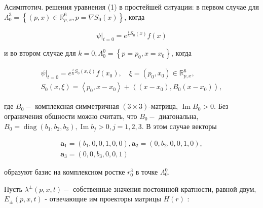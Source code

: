 \documentclass[10pt]{article}
\begin{document}
Асимптотич. решения уравнения (1) в простейшей ситуации: в первом случае для $\Lambda_{0}^{3}=\left\{(p, x) \in \mathbb{R}_{p, x}^{6}, p=\nabla S_{0}(x)\right\}$, когда



\[

\left.\psi\right|_{t=0}=e^{\frac{i}{\hbar} S_{0}(x)} f(x)

\]



и во втором случае для $k=0, \Lambda_{0}^{0}=\left\{p=p_{0}, x=x_{0}\right\}$, когда



\[

\begin{gathered}

\left.\psi\right|_{t=0}=e^{\frac{i}{\hbar} S_{0}(x, \xi)} f\left(x_{0}\right), \quad \xi=\left(p_{0}, x_{0}\right) \in \mathbb{R}_{p, x}^{6}, \\

S_{0}(x, \xi)=\left\langle p_{0}, x-x_{0}\right\rangle+\left\langle\left(x-x_{0}\right), B_{0}\left(x-x_{0}\right)\right\rangle,

\end{gathered}

\]



где $B_{0}-$ комплексная симметричная $(3 \times 3)$-матрица, $\operatorname{Im} B_{0}>0$. Без ограничения общности можно считать, что $B_{0}-$ диагональна, $B_{0}=\operatorname{diag}\left(b_{1}, b_{2}, b_{3}\right), \operatorname{Im} b_{j}>0, j=1,2,3$. В этом случае векторы



\[

\begin{gathered}

\boldsymbol{a}_{1}=\left(b_{1}, 0,0,1,0,0\right), \boldsymbol{a}_{2}=\left(0, b_{2}, 0,0,1,0\right), \\

\boldsymbol{a}_{3}=\left(0,0, b_{3}, 0,0,1\right)

\end{gathered}

\]



образуют базис на комплексном ростке $r_{0}^{3}$ в точке $\Lambda_{0}^{0}$.



Пусть $\lambda^{ \pm}(p, x, t)-$ собственные значения постоянной кратности, равной двум, $E_{ \pm}(p, x, t)$ - отвечающие им проекторы матрицы $H(r)$ :
\end{document}
